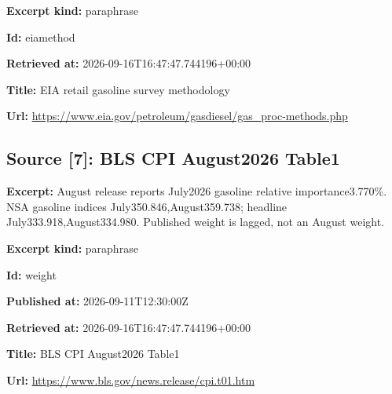 \documentclass[11pt]{article}
\begin{document}
\par\noindent\textbf{Excerpt kind:} paraphrase

\par\noindent\textbf{Id:} eiamethod

\par\noindent\textbf{Retrieved at:} 2026-09-16T1\hspace{0pt}6:47:47.7441\hspace{0pt}96+00:00

\par\noindent\textbf{Title:} EIA retail gasoline survey methodology

\par\noindent\textbf{Url:} \href{https://www.eia.gov/petroleum/gasdiesel/gas\_proc-methods.php}{https://www.\hspace{0pt}eia.gov/petr\hspace{0pt}oleum/gasdie\hspace{0pt}sel/gas\_proc\hspace{0pt}-methods.php}

\subsection*{\textcolor{epdarkgreen}{Source [7]: BLS CPI August2026 Table1}}
\par\noindent\textbf{Excerpt:} August release reports July2026 gasoline relative importance3.770\%. NSA gasoline indices July350.846,August359.738; headline July333.918,August334.980. Published weight is lagged, not an August weight.

\par\noindent\textbf{Excerpt kind:} paraphrase

\par\noindent\textbf{Id:} weight

\par\noindent\textbf{Published at:} 2026-09-11T12:30:00Z

\par\noindent\textbf{Retrieved at:} 2026-09-16T1\hspace{0pt}6:47:47.7441\hspace{0pt}96+00:00

\par\noindent\textbf{Title:} BLS CPI August2026 Table1

\par\noindent\textbf{Url:} \href{https://www.bls.gov/news.release/cpi.t01.htm}{https://www.\hspace{0pt}bls.gov/news\hspace{0pt}.release/cpi\hspace{0pt}.t01.htm}
\end{document}
